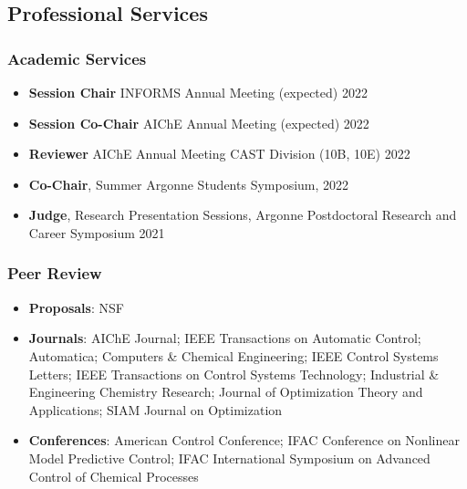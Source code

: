 \documentclass[letterpaper, 11pt]{article}
\begin{document}
\subsection*{Professional Services}
\subsubsection*{Academic Services}
\begin{itemize}[leftmargin=*,itemsep=-1pt]
\item[] {\bf Session Chair} INFORMS Annual Meeting (expected) \hfill 2022
\item[] {\bf Session Co-Chair} AIChE Annual Meeting (expected) \hfill 2022
\item[] {\bf Reviewer} AIChE Annual Meeting CAST Division (10B, 10E) \hfill 2022
\item[] {\bf Co-Chair}, Summer Argonne Students Symposium, \hfill 2022
\item[] {\bf Judge}, Research Presentation Sessions, Argonne Postdoctoral Research and Career Symposium \hfill 2021
\end{itemize}

\subsubsection*{Peer Review}
\begin{itemize}[leftmargin=*]
\item[] {\bf Proposals}: NSF 
\item[] {\bf Journals}: AIChE Journal; IEEE Transactions on Automatic Control; Automatica; Computers \& Chemical Engineering; IEEE Control Systems Letters; IEEE Transactions on Control Systems Technology; Industrial \& Engineering Chemistry Research; Journal of Optimization Theory and Applications; SIAM Journal on Optimization
\item[] {\bf Conferences}: American Control Conference; IFAC Conference on Nonlinear Model Predictive Control; IFAC International Symposium on Advanced Control of Chemical Processes 
\end{itemize}  
\end{document}
